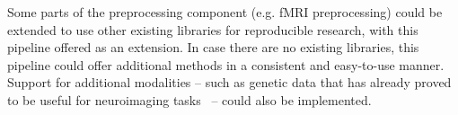 Some parts of the preprocessing component (e.g. fMRI preprocessing) could be extended to use other existing libraries for reproducible research, with this pipeline offered as an extension. In case there are no existing libraries, this pipeline could offer additional methods in a consistent and easy-to-use manner. Support for additional modalities – such as genetic data that has already proved to be useful for neuroimaging tasks~\cite{cole2018brain,parisot2018disease} – could also be implemented.








